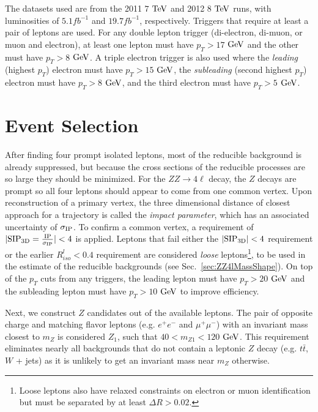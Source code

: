 The datasets used are from the 2011 $7$ $\rm{TeV}$ and 2012 $8$ $\rm{TeV}$ runs, with luminosities of $5.1 fb^{-1}$ and $19.7 fb^{-1}$, respectively. Triggers that require at least a pair of leptons are used. For any double lepton trigger (di-electron, di-muon, or muon and electron), at least one lepton must have $p_T>17$ $\rm{GeV}$ and the other must have $p_T>8$ $\rm{GeV}$. A triple electron trigger is also used where the \textit{leading} (highest $p_T$) electron must have $p_T>15$ $\rm{GeV}$, the \textit{subleading} (second highest $p_T$) electron must have $p_T>8$ $\rm{GeV}$, and the third electron must have $p_T>5$ $\rm{GeV}$.

\section{Event Selection}
\label{sec:ZZ4lSelection}

After finding four prompt isolated leptons, most of the reducible background is already suppressed, but because the cross sections of the reducible processes are so large they should be minimized. For the $ZZ \rightarrow 4\ell$ decay, the $Z$ decays are prompt so all four leptons should appear to come from one common vertex. Upon reconstruction of a primary vertex, the three dimensional distance of closest approach for a trajectory is called the \textit{impact parameter}, which has an associated uncertainty of $\sigma_{\rm{IP}}$. To confirm a common vertex, a requirement of $|\rm{SIP_{3D}}=\frac{\rm{IP}}{\sigma_{\rm{IP}}}|<4$ is applied. Leptons that fail either the $|\rm{SIP_{3D}}|<4$ requirement or the earlier $R_{iso}^l<0.4$ requirement are considered \textit{loose} leptons\footnote{Loose leptons also have relaxed constraints on electron or muon identification but must be separated by at least $\Delta R>0.02$.}, to be used in the estimate of the reducible backgrounds (see Sec.~\ref{sec:ZZ4lMassShape}). On top of the $p_T$ cuts from any triggers, the leading lepton must have $p_T > 20$  $\rm{GeV}$ and the subleading lepton must have $p_T > 10$ $\rm{GeV}$ to improve efficiency.

Next, we construct $Z$ candidates out of the available leptons. The pair of opposite charge and matching flavor leptons (e.g. $e^+e^-$ and $\mu^+\mu^-$) with an invariant mass closest to $m_Z$ is considered $Z_1$, such that $40< m_{Z1} < 120$ $\rm{GeV}$. This requirement eliminates nearly all backgrounds that do not contain a leptonic $Z$ decay (e.g. $t\bar{t}$, $W$ + jets) as it is unlikely to get an invariant mass near $m_Z$ otherwise.

